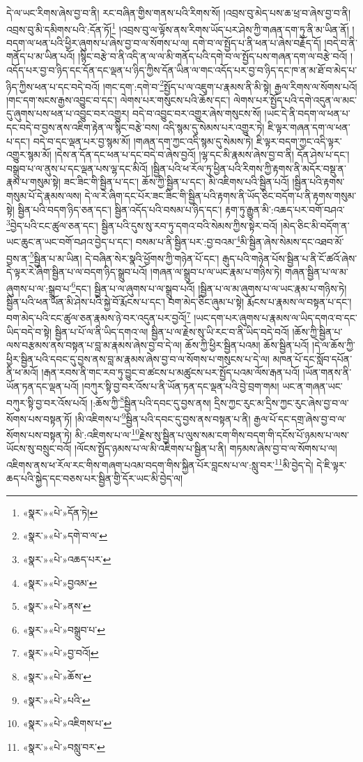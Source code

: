 དེ་ལ་ཡང་རིགས་ཞེས་བྱ་བ་ནི། རང་བཞིན་གྱིས་གནས་པའི་རིགས་སོ། །འབྲས་བུ་མེད་པས་ཆ་ཕྲ་བ་ཞེས་བྱ་བ་ནི། འབྲས་བུ་མི་དམིགས་པའི་:དོན་ཏོ།\footnote{«སྣར་»«པེ་»དོན་ཏེ།} །འབྲས་བུ་ལ་ལྟོས་ནས་རིགས་ཡོད་པར་ཤེས་ཀྱི་གཞན་དག་ཏུ་ནི་མ་ཡིན་ནོ། །བདག་ལ་ཕན་པའི་ཕྱིར་ཞུགས་པ་ཞེས་བྱ་བ་ལ་སོགས་པ་ལ། དགེ་བ་ལ་སྤྱོད་པ་ནི་ཕན་པ་ཞེས་བརྗོད་དོ། །བདེ་བ་ནི་གནོད་པ་མ་ཡིན་པའོ། །སྙིང་བརྩེ་བ་ནི་འདི་ན་ལ་ལ་མི་གནོད་པའི་དགེ་བ་ལ་སྤྱོད་པས་གཞན་དག་ལ་བརྩེ་བའོ། །འདོད་པར་བྱ་བ་ཉིད་དང་དོན་དང་ལྡན་པ་ཉིད་ཀྱིས་དོན་ཡིན་ལ་གང་འདོད་པར་བྱ་བ་ཉིད་དང་ཁ་ན་མ་ཐོ་བ་མེད་པ་ཉིད་ཀྱིས་ཕན་པ་དང་བདེ་བའོ། །གང་དག་:དགེ་བ་\footnote{«སྣར་»«པེ་»དགེ་བ་ལ་}སྤྱོད་པ་ལ་འཇུག་པ་རྣམས་ནི་མི་སྟེ། རྒྱལ་རིགས་ལ་སོགས་པའོ། །གང་དག་སངས་རྒྱས་འབྱུང་བ་དང་། ལེགས་པར་གསུངས་པའི་ཆོས་དང་། ལེགས་པར་སྤྱོད་པའི་དགེ་འདུན་ལ་མང་དུ་ཞུགས་པས་ཕན་པ་འབྱུང་བར་འགྱུར། བདེ་བ་འབྱུང་བར་འགྱུར་ཞེས་གསུངས་སོ། །ཡང་དེ་ནི་བདག་ལ་ཕན་པ་དང་བདེ་བ་བྱས་ནས་འཇིག་རྟེན་ལ་སྙིང་བརྩེ་བས། འདི་སྙམ་དུ་སེམས་པར་འགྱུར་ཏེ། ཇི་ལྟར་གཞན་དག་ལ་ཕན་པ་དང་། བདེ་བ་དང་ལྡན་པར་བྱ་སྙམ་མོ། །གཞན་དག་ཀྱང་འདི་སྙམ་དུ་སེམས་ཏེ། ཇི་ལྟར་བདག་ཀྱང་འདི་ལྟར་འགྱུར་སྙམ་མོ། །དེས་ན་དོན་དང་ཕན་པ་དང་བདེ་བ་ཞེས་བྱའོ། །ལྷ་དང་མི་རྣམས་ཞེས་བྱ་བ་ནི། དོན་ཤེས་པ་དང་། བསྒྲུབ་པ་ལ་ནུས་པ་དང་ལྡན་པས་ལྷ་དང་མིའོ། །སྦྱིན་པའི་ཕ་རོལ་ཏུ་ཕྱིན་པའི་རིགས་ཀྱི་རྟགས་ནི་མདོར་བསྡུ་ན་རྣམ་པ་གསུམ་སྟེ། ཟང་ཟིང་གི་སྦྱིན་པ་དང་། ཆོས་ཀྱི་སྦྱིན་པ་དང་། མི་འཇིགས་པའི་སྦྱིན་པའོ། །སྦྱིན་པའི་རྟགས་གསུམ་པོ་དེ་རྣམས་ལས། དེ་ལ་རེ་ཞིག་དང་པོར་ཟང་ཟིང་གི་སྦྱིན་པའི་རྟགས་ནི་ཡོད་ཅིང་བདོག་པ་ནི་རྟགས་གསུམ་སྟེ། སྦྱིན་པའི་བདག་ཉིད་ཅན་དང་། སྦྱིན་འདོད་པའི་བསམ་པ་ཉིད་དང་། རྟག་ཏུ་རྒྱུན་མི་:འཆད་པར་བགོ་བཤའ་\footnote{«སྣར་»«པེ་»འཆད་པར་}བྱེད་པའི་ངང་ཚུལ་ཅན་དང་། སྦྱིན་པའི་དུས་སུ་རབ་ཏུ་དགའ་བའི་སེམས་ཀྱིས་སྟེར་བའོ། །མེད་ཅིང་མི་བདོག་ན་ཡང་ཆུང་ན་ཡང་བགོ་བཤའ་བྱེད་པ་དང་། བསམ་པ་ནི་སྦྱིན་པར་:བྱ་བའམ་\footnote{«སྣར་»«པེ་»བྱའམ་}མི་སྦྱིན་ཞེས་སེམས་དང་འཐབ་མོ་བྱས་ན་\footnote{«སྣར་»«པེ་»ནས་}སྦྱིན་པ་མ་ཡིན། དེ་བཞིན་སེར་སྣའི་ཕྱོགས་ཀྱི་གཉེན་པོ་དང་། རྒུད་པའི་གཉེན་པོས་སྦྱིན་པ་ནི་ངོ་ཚའོ་ཞེས་དེ་ལྟར་རེ་ཞིག་སྦྱིན་པ་ལ་བདག་ཉིད་སྒྲུབ་པའོ། །གཞན་ལ་སྒྲུབ་པ་ལ་ཡང་རྣམ་པ་གཉིས་ཏེ། གཞན་སྦྱིན་པ་ལ་མ་ཞུགས་པ་ལ་:སྒྲུབ་པ་\footnote{«སྣར་»«པེ་»བསྒྲུབ་པ་}དང་། སྦྱིན་པ་ལ་ཞུགས་པ་ལ་སྒྲུབ་པའོ། །སྦྱིན་པ་ལ་མ་ཞུགས་པ་ལ་ཡང་རྣམ་པ་གཉིས་ཏེ། སྦྱིན་པའི་ཕན་ཡོན་མི་ཤེས་པའི་སྐྱེ་བོ་རྨོངས་པ་དང་། བག་མེད་ཅིང་ཞུམ་པ་སྟེ། རྨོངས་པ་རྣམས་ལ་བསྟན་པ་དང་། བག་མེད་པའི་ངང་ཚུལ་ཅན་རྣམས་ཉེ་བར་འདུན་པར་བྱའོ།\footnote{«སྣར་»«པེ་»བྱ་བའོ།} །ཡང་དག་པར་ཞུགས་པ་རྣམས་ལ་ཡིད་དགའ་བ་དང་ཡིད་བདེ་བ་སྟེ། སྦྱིན་པ་པོ་ལ་ནི་ཡིད་དགའ་ལ། སྦྱིན་པ་ལ་རྗེས་སུ་ཡི་རང་བ་ནི་ཡིད་བདེ་བའོ། །ཆོས་ཀྱི་སྦྱིན་པ་ལས་བརྩམས་ནས་བསྟན་པ་བླ་མ་རྣམས་ཞེས་བྱ་བ་དེ་ལ། ཆོས་ཀྱི་ཕྱིར་སྦྱིན་པའམ། ཆོས་སྦྱིན་པའོ། །དེ་ལ་ཆོས་ཀྱི་ཕྱིར་སྦྱིན་པའི་དབང་དུ་བྱས་ནས་བླ་མ་རྣམས་ཞེས་བྱ་བ་ལ་སོགས་པ་གསུངས་པ་དེ་ལ། མཁན་པོ་དང་སློབ་དཔོན་ནི་ཕ་མའོ། །རྒན་རབས་ནི་གང་རབ་ཏུ་བྱུང་བ་ཚངས་པ་མཚུངས་པར་སྤྱོད་པའམ་ལོས་རྒན་པའོ། །ཡོན་གནས་ནི་ཡོན་ཏན་དང་ལྡན་པའོ། །བཀུར་སྟི་བྱ་བར་འོས་པ་ནི་ཡོན་ཏན་དང་ལྡན་པའི་བྱེ་བྲག་གམ། ཡང་ན་གཞན་ཡང་བཀུར་སྟི་བྱ་བར་འོས་པའོ། །:ཆོས་ཀྱི་\footnote{«སྣར་»«པེ་»ཆོས་}སྦྱིན་པའི་དབང་དུ་བྱས་ནས། དྲིས་ཀྱང་རུང་མ་དྲིས་ཀྱང་རུང་ཞེས་བྱ་བ་ལ་སོགས་པས་བསྟན་ཏོ། །མི་འཇིགས་པ་\footnote{«སྣར་»«པེ་»པའི་}སྦྱིན་པའི་དབང་དུ་བྱས་ནས་བསྟན་པ་ནི། རྒྱལ་པོ་དང་དགྲ་ཞེས་བྱ་བ་ལ་སོགས་པས་བསྟན་ཏེ། མི་:འཇིགས་པ་ལ་\footnote{«སྣར་»«པེ་»འཇིགས་པ་}རྗེས་སུ་སྦྱིན་པ་ལུས་སམ་ངག་གིས་བདག་གི་དངོས་པོ་ཉམས་པ་ལས་ཡོངས་སུ་བསྲུང་བའོ། །ལོངས་སྤྱོད་ཉམས་པ་ལ་མི་འཇིགས་པ་སྦྱིན་པ་ནི། གཏམས་ཞེས་བྱ་བ་ལ་སོགས་པ་ལ། འཇིགས་ནས་ཕ་རོལ་རང་གིས་གཞག་པའམ་བདག་གིས་སྐྱིན་པོར་བླངས་པ་ལ་:སླུ་བར་\footnote{«སྣར་»«པེ་»བསླུ་བར་}མི་བྱེད་དེ། དེ་ཇི་ལྟར་ཆད་པའི་སྐྱེད་དང་བཅས་པར་སྦྱིན་གྱི་དོར་ཡང་མི་བྱེད་ལ། 